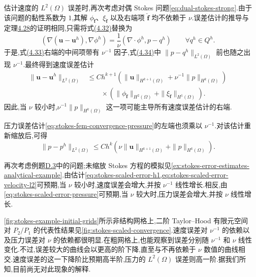 \begin{note}[缩放 Stokes 问题]
估计速度的 $L^2(\Omega)$ 误差时,再次考虑对偶 Stokes 问题\cref{eq:dual-stokes-strong}.由于该问题的黏性系数为 $1$,其解 $\phi_{\widehat{\bm{f}}}$、$\xi_{\widehat{\bm{f}}}$ 以及右端项 $\widehat{\bm{f}}$ 均不依赖于 $\nu$.误差估计的推导与定理\hyperref[thm:stokes-error-velocity-l2]{4.28}的证明相同,只需将式\hyperref[eq:stokes-error-velocity-l2-discrete-identity]{(4.32)}替换为
\[
  (\nabla(\bm{u}-\bm{u}^h),\nabla\phi^h)
  =\frac{1}{\nu}(\nabla\cdot\phi^h,p-q^h)
  \qquad\forall q^h\in Q^h.
\]
于是,式\hyperref[eq:stokes-error-velocity-l2-approximation-identity]{(4.33)}右端的中间项带有 $\nu^{-1}$ 因子,式\hyperref[eq:stokes-error-velocity-l2-bound]{(4.34)}中 $\|p-q^h\|_{L^2(\Omega)}$ 前也随之出现 $\nu^{-1}$.最终得到速度误差估计
\begin{equation}\label{eq:stokes-scaled-error-velocity-l2}
\begin{aligned}
  \|\bm{u}-\bm{u}^h\|_{L^2(\Omega)}
  &\leq Ch^{k+1}\left(
      \|\bm{u}\|_{H^{k+1}(\Omega)}
      +\nu^{-1}\|p\|_{H^k(\Omega)}
    \right)\\
  &\qquad\times\left(
      \|\phi_{\widehat{\bm{f}}}\|_{H^2(\Omega)}
      +\|\xi_{\widehat{\bm{f}}}\|_{H^1(\Omega)}
    \right).
\end{aligned}
\end{equation}
因此,当 $\nu$ 较小时,$\nu^{-1}\|p\|_{H^k(\Omega)}$ 这一项可能主导所有速度误差估计的右端.

压力误差估计\cref{eq:stokes-fem-convergence-pressure}的左端也须乘以 $\nu^{-1}$.对该估计重新缩放后,可得
\begin{equation}\label{eq:stokes-scaled-error-pressure}
  \|p-p^h\|_{L^2(\Omega)}
  \leq Ch^k\left(
    \nu\|\bm{u}\|_{H^{k+1}(\Omega)}
    +\|p\|_{H^k(\Omega)}
  \right).
\end{equation}
\end{note}

\begin{example}[缩放 Stokes 问题]\label{ex:stokes-scaled-example}
再次考虑例题\hyperref[ex:appendix-d-3]{D.3}中的问题;未缩放 Stokes 方程的模拟见\cref{ex:stokes-error-estimates-analytical-example}.由估计\cref{eq:stokes-scaled-error-h1,eq:stokes-scaled-error-velocity-l2}可预期,当 $\nu$ 较小时,速度误差会增大,并按 $\nu^{-1}$ 线性增长.相反,由\cref{eq:stokes-scaled-error-pressure}可预期,当 $\nu$ 较大时,压力误差会增大,并按 $\nu$ 线性增长.

\cref{fig:stokes-example-initial-grids}所示非结构网格上,二阶 Taylor--Hood 有限元空间对 $P_2/P_1$ 的代表性结果见\cref{fig:stokes-scaled-convergence}.速度误差对 $\nu^{-1}$ 的依赖以及压力误差对 $\nu$ 的依赖都很明显.在粗网格上,也能观察到误差分别随 $\nu^{-1}$ 和 $\nu$ 线性变化.不过,误差较大的曲线会以更高的阶下降,直至与不再依赖于 $\nu$ 数值的曲线相交.速度误差的这一下降阶比预期高半阶,压力的 $L^2(\Omega)$ 误差则高一阶.据我们所知,目前尚无对此现象的解释.
\end{example}

